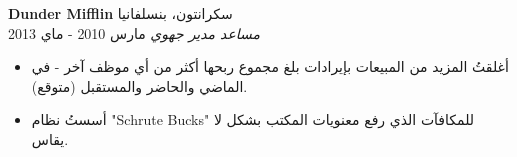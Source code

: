 \foreignlanguage{english}{\textbf{Dunder Mifflin}} \hfill سكرانتون، بنسلفانيا\\
\textit{مساعد مدير جهوي} \hfill مارس 2010 - ماي 2013\\
\vspace*{-4pt}
\begin{itemize} \itemsep 1pt
	\item أغلقتُ المزيد من المبيعات بإيرادات بلغ مجموع ربحها أكثر من أي موظف آخر - في الماضي والحاضر والمستقبل (متوقع).
	\item أسستُ نظام \foreignlanguage{english}{"Schrute Bucks"} للمكافآت الذي رفع معنويات المكتب بشكل لا يقاس.
\end{itemize}
